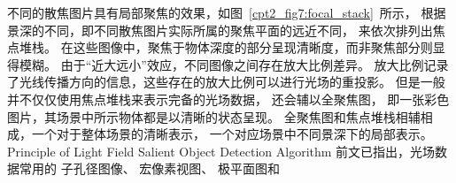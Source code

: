 %
%
%
%
\indent
不同的散焦图片具有局部聚焦的效果，如图~\ref{cpt2_fig7:focal_stack}~所示，
根据景深的不同，即不同散焦图片实际所属的聚焦平面的远近不同，
来依次排列出焦点堆栈。
在这些图像中，聚焦于物体深度的部分呈现清晰度，而非聚焦部分则显得模糊。
由于“近大远小”效应，不同图像之间存在放大比例差异。
放大比例记录了光线传播方向的信息，这些存在的放大比例可以进行光场的重投影。
但是一般并不仅仅使用焦点堆栈来表示完备的光场数据，
还会辅以全聚焦图，
即一张彩色图片，其场景中所示物体都是以清晰的状态呈现。
全聚焦图和焦点堆栈相辅相成，一个对于整体场景的清晰表示，
一个对应场景中不同景深下的局部表示。
%
%
%
%
%
%
%
%
%
%
%
%
%
%
%
%
%
%
{Principle of Light Field Salient Object Detection Algorithm}
%
%
%
%
%
%
前文已指出，光场数据常用的
子孔径图像、
宏像素视图、
极平面图和
